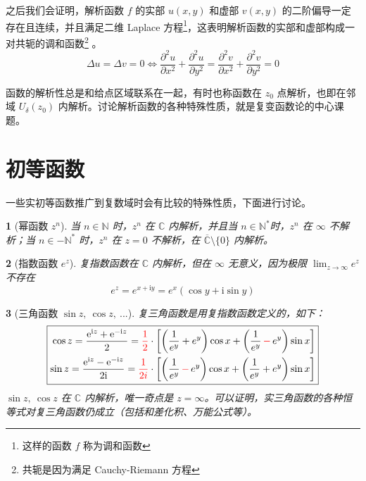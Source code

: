 \documentclass[UTF8]{report}
\def\N{\mathbb{N}}
\def\C{\mathbb{C}}
\theoremstyle{MyLineTheoremStyle} %
\theoremstyle{MyBlockTheoremStyle} %
\theoremstyle{MySubsubsectionStyle} %
\newtheorem{definition}{}
\begin{document}
    之后我们会证明，解析函数 $f$ 的实部 $u(x,y)$ 和虚部 $v(x,y)$ 的二阶偏导一定存在且连续，并且满足二维 Laplace 方程\footnote{这样的函数 $f$ 称为调和函数}，这表明解析函数的实部和虚部构成一对共轭的调和函数\footnote{共轭是因为满足 Cauchy-Riemann 方程}
    。
    \begin{equation}
        \Delta u = \Delta v = 0 \Longleftrightarrow
        \frac{\partial^{2}u}{\partial x^{2}}+\frac{\partial^{2}u}{\partial y^{2}}=\frac{\partial^{2}v}{\partial x^{2}}+\frac{\partial^{2}v}{\partial y^{2}}=0
    \end{equation}
    
    函数的解析性总是和给点区域联系在一起，有时也称函数在 $z_0$ 点解析，也即在邻域 $U_{\delta}(z_0)$ 内解析。讨论解析函数的各种特殊性质，就是复变函数论的中心课题。
    



\section{初等函数}

一些实初等函数推广到复数域时会有比较的特殊性质，下面进行讨论。



\begin{definition}[幂函数 $z^n$]
当 $n \in \N$ 时，$z^n$ 在 $\C$ 内解析，并且当 $n \in \N^*$时，$z^n$ 在 $\infty$ {\color{red} 不解析}；当 $n \in -\N^*$ 时，$z^n$ 在 $z=0$ {\color{red} 不解析}，在 $\overline{\C}\setminus \{0\}$ 内解析。
\end{definition}


\begin{definition}[指数函数 $e^z$]
复指数函数在 $\C$ 内解析，但在 $\infty$ 无意义，因为极限 $\lim_{z \to \infty}e^z$ 不存在
\begin{equation}
e^z = e^{x + \mathrm{i} y} = e^x(\cos y + \mathrm{i} \sin y)
\end{equation}
\end{definition}


\begin{definition}[三角函数 $\sin z,\ \cos z,\ ...$]
复三角函数是用复指数函数定义的，如下：
\begin{gather}
\boxed{
    \begin{aligned}
        \cos z
        =\frac{\mathrm{e}^{\mathrm{i}z}+\mathrm{e}^{-\mathrm{i}z}}{2}
        = {\color{red} \frac{1}{2}}\cdot \left[ \left( \frac{1}{e^y} + e^y \right)\cos x + \left( \frac{1}{e^y} {\color{red} \,-\,} e^y \right)\sin x \right]
        \\
        \sin z
        =\frac{\mathrm{e}^{\mathrm{i}z}-\mathrm{e}^{-\mathrm{i}z}}{2\mathrm{i}} 
        = {\color{red} \frac{1}{2i}}\cdot \left[ \left( \frac{1}{e^y} {\color{red} \,-\,} e^y \right)\cos x + \left( \frac{1}{e^y} + e^y \right)\sin x \right]
    \end{aligned}
}
\end{gather}
$\sin z,\ \cos z$ 在 $\C$ 内解析，唯一奇点是 $z = \infty$。可以证明，实三角函数的各种恒等式对复三角函数仍成立（包括和差化积、万能公式等）。
\end{definition}
\end{document}
